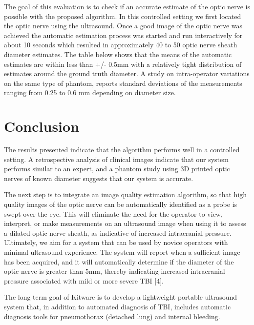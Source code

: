 \documentclass{llncs}
\begin{document}
The goal of this evaluation is to check if an accurate estimate of the optic
nerve is possible with the proposed algorithm. In this controlled setting we
first located the optic nerve using the ultrasound. Once a good image of the
optic nerve was achieved the automatic estimation process was started and run
interactively for about 10 seconds which resulted in approximately 40 to 50
optic nerve sheath diameter estimates. The table below shows that the means of
the automatic estimates are within less than +/- 0.5mm  with a relatively tight
distribution of estimates around the ground truth diameter. A study on
intra-operator variations on the same type of phantom, reports standard
deviations of the measurements ranging from 0.25 to 0.6 mm depending on
diameter size.  

\section{Conclusion}
The results presented indicate that the algorithm performs well in a controlled
setting.  A retrospective analysis of clinical images indicate that our system
performs similar to an expert, and a phantom study using 3D printed optic
nerves of known diameter suggests that our system is accurate.

The next step is to integrate an image quality estimation algorithm, so that
high quality images of the optic nerve can be automatically identified as a
probe is swept over the eye. This will eliminate the need for the operator to
view, interpret, or make measurements on an ultrasound image when using it to
assess a dilated optic nerve sheath, as indicative of increased intracranial
pressure. Ultimately, we aim for a system that can be used by novice operators
with minimal ultrasound experience. The system will report when a sufficient
image has been acquired, and it will automatically determine if the diameter of
the optic nerve is greater than 5mm, thereby indicating increased intracranial
pressure associated with mild or more severe TBI [4].

The long term goal of Kitware is to develop a lightweight portable ultrasound
system that, in addition to automated diagnosis of TBI, includes automatic
diagnosis tools for pneumothorax (detached lung) and internal bleeding.
\end{document}
